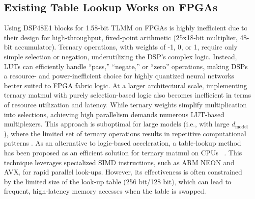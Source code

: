 \documentclass[sigconf]{acmart}
\begin{document}
\subsection{Existing Table Lookup Works on FPGAs}
Using DSP48E1 blocks for 1.58-bit TLMM on FPGAs is highly inefficient due to their design for high-throughput, fixed-point arithmetic (25x18-bit multiplier, 48-bit accumulator). Ternary operations, with weights of -1, 0, or 1, require only simple selection or negation, underutilizing the DSP’s complex logic. Instead, LUTs can efficiently handle “pass,” “negate,” or “zero” operations, making DSPs a resource- and power-inefficient choice for highly quantized neural networks better suited to FPGA fabric logic.
At a larger architectural scale, implementing ternary matmul with purely selection-based logic also becomes inefficient in terms of resource utilization and latency. While ternary weights simplify multiplication into selections, achieving high parallelism demands numerous LUT-based multiplexers. This approach is suboptimal for large models (i.e., with large $d_{\text{model}}$), where the limited set of ternary operations results in repetitive computational patterns \cite{TLMAC}. 
As an alternative to logic-based acceleration, a table-lookup method has been proposed as an efficient solution for ternary matmul on CPUs ~\cite{tmac}. This technique leverages specialized SIMD instructions, such as ARM NEON and AVX, for rapid parallel look-ups. However, its effectiveness is often constrained by the limited size of the look-up table (256 bit/128 bit), which can lead to frequent, high-latency memory accesses when the table is swapped.
\end{document}
